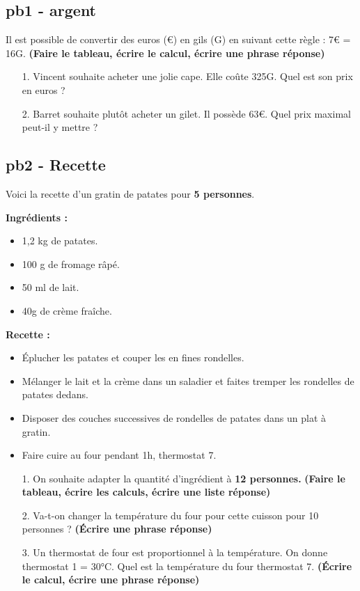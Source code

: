 \documentclass[11pt]{article}
\begin{document}
\subsection*{pb1 - argent}
Il est possible de convertir des euros (€) en gils (G) en suivant cette règle : 7€ = 16G.
\textbf{(Faire le tableau, écrire le calcul, écrire une phrase réponse)}

\begin{enumerate}
  \item[1.] Vincent souhaite acheter une jolie cape. Elle coûte 325G. Quel est son prix en euros ? 
  \item[2.] Barret souhaite plutôt acheter un gilet. Il possède 63€. Quel prix maximal peut-il y mettre ?
\end{enumerate}

\subsection*{pb2 - Recette}
Voici la recette d'un gratin de patates pour \textbf{5 personnes}. 

\begin{minipage}[t]{0.45\textwidth}
  \textbf{Ingrédients : }
  \begin{itemize}
    \item 1,2 kg de patates.
    \item 100 g de fromage râpé.
    \item 50 ml de lait.
    \item 40g de crème fraîche.
  \end{itemize}

\end{minipage}
\begin{minipage}[t]{0.5\textwidth}
  \textbf{Recette :}
  \begin{itemize}
    \item Éplucher les patates et couper les en fines rondelles.
    \item Mélanger le lait et la crème dans un saladier et faites tremper les rondelles de patates dedans.
    \item Disposer des couches successives de rondelles de patates dans un plat à gratin. 
    \item Faire cuire au four pendant 1h, thermostat 7.
  \end{itemize}
\end{minipage}

\begin{enumerate}
  \item[1.] On souhaite adapter la quantité d'ingrédient à \textbf{12 personnes.} \textbf{(Faire le tableau, écrire les calculs, écrire une liste réponse)}
  \item[2.] Va-t-on changer la température du four pour cette cuisson pour 10 personnes ?  \textbf{(Écrire une phrase réponse)}
  \item[3.] Un thermostat de four est proportionnel à la température. On donne thermostat 1 = 30°C. Quel est la température du four thermostat 7. \textbf{(Écrire le calcul, écrire une phrase réponse)} 
\end{enumerate}
\end{document}
